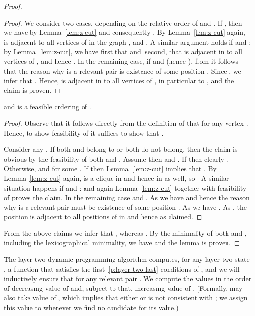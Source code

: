 \begin{proof}
\begin{proof}
We consider two cases, depending on the relative order of  and . If , then we have  by Lemma~\ref{lem:z-cut}
and consequently . By Lemma~\ref{lem:z-cut} again,  is adjacent to all vertices of 
in the graph , and .
A similar argument holds if  and : by Lemma~\ref{lem:z-cut}, we have first that  and, second,
that  is adjacent in  to all vertices of , and hence .
In the remaining case, if  and  (hence ),  from  it follows that the reason why  is a relevant pair
is existence of some position . Since , we infer that . Hence,  is
adjacent in  to all vertices of , in particular to , and the claim is proven.  
\cqed\end{proof}

\begin{claim}\label{cl:layer-two:Gup} 
 and  is a feasible ordering of .
\end{claim}
\begin{proof}
Observe that it follows directly from the definition of  that  for any vertex .
Hence, to show feasibility of  it suffices to show that .

Consider any . If both  and  belong to  or both do not belong,
then the claim is obvious by the feasibility of both  and .
Assume then  and . If  then clearly . 
Otherwise,  and  for some .
If  then Lemma~\ref{lem:z-cut} implies that .
By Lemma~\ref{lem:z-cut} again,  is a clique in  and hence in  as well, so .
A similar situation happens if  and :  and again Lemma~\ref{lem:z-cut}
together with feasibility of  proves the claim.
In the remaining case  and . As  we have  and hence the reason why  is a relevant pair
must be existence of some position . As  we have . As ,
the position  is adjacent to all positions of  in  and hence  as claimed.
\cqed\end{proof}

From the above claims we infer that , whereas
.
By the minimality of both  and , including the lexicographical minimality, we have  and the lemma is proven.
\end{proof}

The layer-two dynamic programming algorithm computes,
for any layer-two state ,   
a function 
that satisfies the first~\ref{p:layer-two-last} conditions of , and we will inductively ensure that 
for any relevant pair .
We compute the values  in the order of decreasing value of  and, subject to that, increasing value of .
(Formally,  may also take value of , which implies that either  or  is not consistent with ;
 we assign this value to  whenever we find no candidate for its value.)

